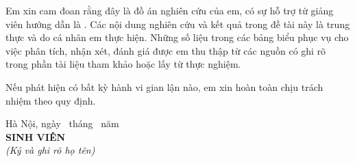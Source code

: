 Em xin cam đoan rằng đây là đồ án nghiên cứu của em, có sự hỗ trợ từ giảng viên hướng dẫn là \TenGiangVien.
Các nội dung nghiên cứu và kết quả trong đề tài này là trung thực và do cá nhân em thực hiện.
Những số liệu trong các bảng biểu phục vụ cho việc phân tích, nhận xét, đánh giá được em
thu thập từ các nguồn có ghi rõ trong phần tài liệu tham khảo hoặc lấy từ thực nghiệm.

Nếu phát hiện có bất kỳ hành vi gian lận nào, em xin hoàn toàn chịu trách nhiệm theo quy định.

\vspace{16mm}
\begin{flushright}
Hà Nội, ngày \NgayBaoVe\ tháng \ThangBaoVe\ năm \NamBaoVe\\[4mm]
\textbf{SINH VIÊN}\\
\textit{(Ký và ghi rõ họ tên)}\\[24mm]
\TenSinhVien
\end{flushright}
